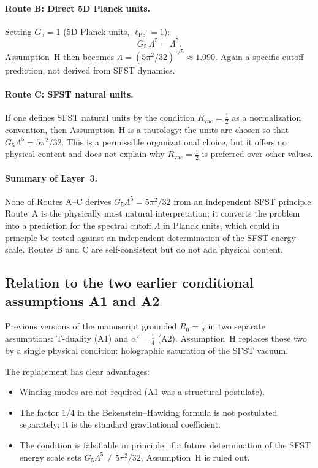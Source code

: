 \paragraph{Route B: Direct 5D Planck units.}
Setting $G_5=1$ (5D Planck units, $\ell_{\mathrm{P5}}=1$):
\[
  G_5\,\Lambda^5 = \Lambda^5.
\]
Assumption~H then becomes $\Lambda=(5\pi^2/32)^{1/5}\approx 1.090$.
Again a specific cutoff prediction, not derived from SFST dynamics.

\paragraph{Route C: SFST natural units.}
If one defines SFST natural units by the condition
$R_{\mathrm{vac}}=\tfrac{1}{2}$ as a normalization convention, then
Assumption~H is a tautology: the units are chosen so that
$G_5\Lambda^5=5\pi^2/32$.  This is a permissible organizational
choice, but it offers no physical content and does not explain why
$R_{\mathrm{vac}}=\tfrac{1}{2}$ is preferred over other values.

\paragraph{Summary of Layer~3.}
None of Routes A--C derives $G_5\Lambda^5=5\pi^2/32$ from an
independent SFST principle.  Route~A is the physically most natural
interpretation; it converts the problem into a prediction for the
spectral cutoff $\Lambda$ in Planck units, which could in principle be
tested against an independent determination of the SFST energy scale.
Routes B and C are self-consistent but do not add physical content.

\subsection{Relation to the two earlier conditional assumptions
  A1 and A2}
\label{ssec:relAtoH}

Previous versions of the manuscript grounded $R_0=\tfrac{1}{2}$ in
two separate assumptions: T-duality (A1) and $\alpha'=\tfrac{1}{4}$
(A2).  Assumption~H replaces those two by a single physical condition:
holographic saturation of the SFST vacuum.

The replacement has clear advantages:
\begin{itemize}[leftmargin=1.5em]
  \item Winding modes are not required (A1 was a structural postulate).
  \item The factor $1/4$ in the Bekenstein--Hawking formula is not
        postulated separately; it is the standard gravitational
        coefficient.
  \item The condition is falsifiable in principle: if a future
        determination of the SFST energy scale sets
        $G_5\Lambda^5\neq 5\pi^2/32$, Assumption~H is ruled out.
\end{itemize}

